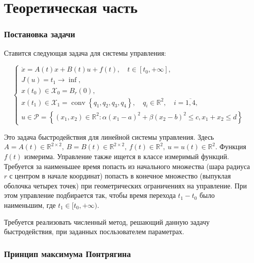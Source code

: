 \documentclass[12pt, a4paper]{article} %
\renewcommand{\le}{\leqslant}
\newcommand{\Real}{\mathbb{R}}
\DeclareMathOperator{\conv}{conv}
\begin{document}


\tableofcontents

\newpage

\part{Теоретическая часть}

\section{Постановка задачи}

Ставится следующая задача для системы управления:

\begin{equation}\label{eq:problem}
    \begin{cases}
        \dot{x} = A(t)x + B(t)u + f(t), \quad t \in [t_0, +\infty],\\
        J(u) = t_1 \rightarrow \inf, \\
        x(t_0) \in \mathcal{X}_0 = B_r(0), \\
        x(t_1) \in \mathcal{X}_1 = \conv \left\{ q_1, q_2, q_3, q_4 \right\},
        \quad q_i \in \mathbb{R}^2, \quad i = \overline{1,4}, \\
        u \in \mathcal{P} = \left\{ (x_1, x_2) \in \mathbb{R}^2 \colon 
            \alpha (x_1 - a) ^2 + \beta (x_2 - b)^2 \le c,
            x_1 + x_2 \le d
        \right\}
    \end{cases}
\end{equation} 

Это задача быстродействия для линейной системы управления.
Здесь $A = A(t) \in \Real^{2\times 2},\ B = B(t) \in \Real^{2\times 2},\ f(t) \in \Real^2,\ u = u(t) \in \Real^2$. 
Функция $f(t)$ измерима. Управление также ищется в классе измеримый функций.
Требуется за наименьшее время попасть из начального множества 
(шара радиуса $r$ с центром в начале координат) попасть в конечное множество
(выпуклая оболочка четырех точек) при геометрических
ограничениях на управление. 
При этом управление подбирается так, чтобы время перехода $t_1 - t_0$ было 
наименьшим, где $t_1 \in [t_0, +\infty)$.


Требуется реализовать численный метод, решающий данную задачу быстродействия,
при заданных посльзователем параметрах.

\section{Принцип максимума Понтрягина}
\end{document}

